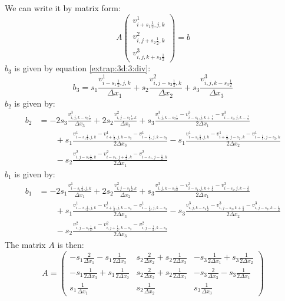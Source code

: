 We can write it by matrix form:
\begin{equation}
 A\begin{pmatrix}
   v^{1}_{i+s_1\frac{1}{2},j,k}\\
   v^2_{i,j+s_2\frac{1}{2},k}\\
   v^{3}_{i,j,k+s_3\frac{1}{2}}
  \end{pmatrix}=b
\end{equation}
$b_3$ is given by equation \ref{extrap:3d:3:div}:
\begin{equation}
 b_3=s_1\frac{v^{1}_{i-s_1\frac{1}{2},j,k}}{\Delta x_1}+s_2\frac{v^{2}_{i,j-s_2\frac{1}{2},k}}{\Delta x_2}+s_3\frac{v^{3}_{i,j,k-s_3\frac{1}{2}}}{\Delta x_3}
\end{equation}
$b_2$ is given by:
\begin{equation}
\begin{split}
	b_2&=-2s_3\frac{v^{3}_{i,j,k-s_3\frac{1}{2}}}{\Delta x_3}+2s_2\frac{v^{2}_{i,j-s_2\frac{1}{2}.k}}{\Delta x_2}+s_3\frac{v^{3}_{i,j,k-s_3\frac{1}{2}}-v^{3}_{i-s_1,j,k+\frac{1}{2}}-v^{3}_{i-s_1,j,k-\frac{1}{2}}}{2\Delta x_1}\\
	&\qquad +s_1\frac{v^{1}_{i-s_1\frac{1}{2},j,k}-v^{1}_{i+\frac{1}{2},j,k-s_3}-v^{1}_{i-\frac{1}{2},j,k-s_3}}{2\Delta x_3}-s_1\frac{v^{1}_{i-s_1\frac{1}{2},j,k}-v^{1}_{i+\frac{1}{2},j-s_2,k}-v^{1}_{i-\frac{1}{2},j-s_2,k}}{2\Delta x_2}\\
	&\qquad -s_2\frac{v^{2}_{i,j-s_2\frac{1}{2},k}-v^{2}_{i-s_1,j+\frac{1}{2},k}-v^{2}_{i-s_1,j-\frac{1}{2},k}}{2\Delta x_1}
\end{split}
	\end{equation}
$b_1$ is given by:
\begin{equation}
\begin{split}
	b_1&=-2s_1\frac{v^{1}_{i-s_1\frac{1}{2},j,k}}{\Delta x_1}+2s_2\frac{v^{2}_{i,j-s_2\frac{1}{2}.k}}{\Delta x_2}
	+s_3\frac{v^{3}_{i,j,k-s_3\frac{1}{2}}-v^{3}_{i-s_1,j,k+\frac{1}{2}}-v^{3}_{i-s_1,j,k-\frac{1}{2}}}{2\Delta x_1}\\
	&\qquad +s_1\frac{v^{1}_{i-s_1\frac{1}{2},j,k}-v^{1}_{i+\frac{1}{2},j,k-s_3}-v^{1}_{i-\frac{1}{2},j,k-s_3}}{2\Delta x_3}
	-s_3\frac{v^{3}_{i,j,k-s_3\frac{1}{2}}-v^{3}_{i,j-s_2,k+\frac{1}{2}}-v^{3}_{i,j-s_2,k-\frac{1}{2}}}{2\Delta x_2}\\
	&\qquad -s_2\frac{v^{2}_{i,j-s_2\frac{1}{2},k}-v^{2}_{i,j+\frac{1}{2},k-s_3}-v^{2}_{i,j-\frac{1}{2},k-s_3}}{2\Delta x_3}
	\end{split}
\end{equation}
The matrix $A$ is then:
\begin{equation}
 A=\begin{pmatrix}
    -s_1\frac{2}{\Delta x_1}-s_1\frac{1}{2\Delta x_3}&s_2\frac{2}{\Delta x_2}+s_2\frac{1}{2\Delta x_3}&-s_3\frac{1}{2\Delta x_1}+s_3\frac{1}{2\Delta x_2}\\
    -s_1\frac{1}{2\Delta x_3}+s_1\frac{1}{2\Delta x_2}&s_2\frac{2}{\Delta x_2}+s_2\frac{1}{2\Delta x_1}&-s_3\frac{2}{\Delta x_3}-s_3\frac{1}{2\Delta x_1}\\
    s_1\frac{1}{\Delta x_1}&s_2\frac{1}{\Delta x_2}&s_3\frac{1}{\Delta x_3}
   \end{pmatrix}
\end{equation}

